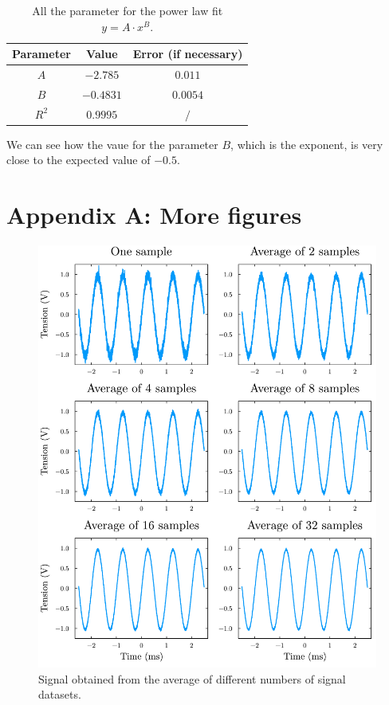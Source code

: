 \documentclass[a4paper,12pt]{article}
\begin{document}
\begin{table}[h]
    \centering
    \begin{tabular}{|c|c|c|}
        \hline
        Parameter & Value & Error (if necessary) \\
        \hline
        $A$ & $-2.785$ & $0.011$ \\
        $B$ & $-0.4831$ & $0.0054$ \\
        $R^2$ & $0.9995$ & $/$ \\
        \hline
    \end{tabular}
    \caption{All the parameter for the power law fit $y=A \cdot x^B$.}
    \label{tab:powerlaw_results}
\end{table}

We can see how the vaue for the parameter $B$, which is the exponent, 
is very close to the expected value of $-0.5$. 






\newpage
\section{Appendix A: More figures}
\begin{figure}[H]
    \centering
    \includegraphics[width=1\textwidth]{Signal_fix.pdf}
    \caption{Signal obtained from the average of different numbers of signal datasets.}
    \label{plot:Noise_decay_signal}
\end{figure}
\end{document}
